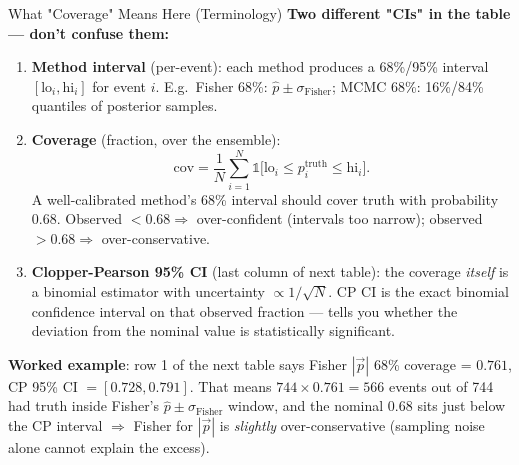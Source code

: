 \documentclass[aspectratio=169]{beamer}
\begin{document}
\begin{frame}{What "Coverage" Means Here (Terminology)}
\small
\textbf{Two different "CIs" in the table — don't confuse them:}

\begin{enumerate}
\item \textbf{Method interval} (per-event): each method produces a 68\%/95\% interval $[\mathrm{lo}_i, \mathrm{hi}_i]$ for event $i$. E.g.\ Fisher 68\%: $\hat{p}\pm\sigma_\mathrm{Fisher}$; MCMC 68\%: 16\%/84\% quantiles of posterior samples.
\item \textbf{Coverage} (fraction, over the ensemble):
\[
\mathrm{cov} = \frac{1}{N}\sum_{i=1}^{N}\mathbb{1}\bigl[\mathrm{lo}_i \le p^{\mathrm{truth}}_i \le \mathrm{hi}_i\bigr].
\]
A well-calibrated method's 68\% interval should cover truth with probability 0.68. Observed $<0.68 \Rightarrow$ over-confident (intervals too narrow); observed $>0.68 \Rightarrow$ over-conservative.
\item \textbf{Clopper-Pearson 95\% CI} (last column of next table): the coverage \emph{itself} is a binomial estimator with uncertainty $\propto 1/\sqrt{N}$. CP CI is the exact binomial confidence interval on that observed fraction — tells you whether the deviation from the nominal value is statistically significant.
\end{enumerate}

\textbf{Worked example}: row 1 of the next table says Fisher $|\vec{p}|$ 68\% coverage = $0.761$, CP 95\% CI $= [0.728, 0.791]$. That means $744 \times 0.761 = 566$ events out of 744 had truth inside Fisher's $\hat{p}\pm\sigma_\mathrm{Fisher}$ window, and the nominal 0.68 sits just below the CP interval $\Rightarrow$ Fisher for $|\vec p|$ is \emph{slightly} over-conservative (sampling noise alone cannot explain the excess).
\end{frame}
\end{document}
